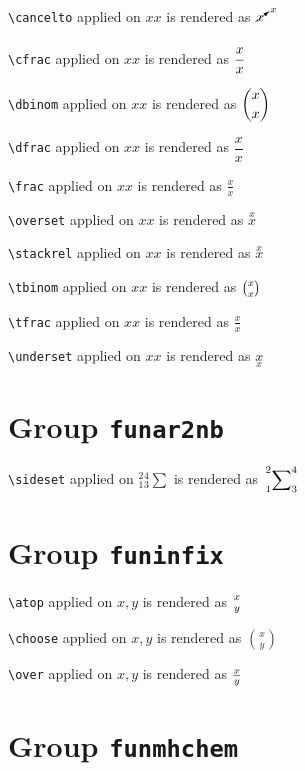 \texttt{\textbackslash cancelto} applied on ${x}{x}$ is rendered as $\cancelto{x}{x}$

\texttt{\textbackslash cfrac} applied on ${x}{x}$ is rendered as $\cfrac{x}{x}$

\texttt{\textbackslash dbinom} applied on ${x}{x}$ is rendered as $\dbinom{x}{x}$

\texttt{\textbackslash dfrac} applied on ${x}{x}$ is rendered as $\dfrac{x}{x}$

\texttt{\textbackslash frac} applied on ${x}{x}$ is rendered as $\frac{x}{x}$





\texttt{\textbackslash overset} applied on ${x}{x}$ is rendered as $\overset{x}{x}$



\texttt{\textbackslash stackrel} applied on ${x}{x}$ is rendered as $\stackrel{x}{x}$

\texttt{\textbackslash tbinom} applied on ${x}{x}$ is rendered as $\tbinom{x}{x}$

\texttt{\textbackslash tfrac} applied on ${x}{x}$ is rendered as $\tfrac{x}{x}$

\texttt{\textbackslash underset} applied on ${x}{x}$ is rendered as $\underset{x}{x}$

\section{ Group \texttt{fun\textunderscore ar2nb}}

\texttt{\textbackslash sideset} applied on ${_1^2}{_3^4}\sum$ is rendered as $\sideset{_1^2}{_3^4}\sum$

\section{ Group \texttt{fun\textunderscore infix}}

\texttt{\textbackslash atop} applied on $ x, y$ is rendered as $x\atop y$

\texttt{\textbackslash choose} applied on $ x, y$ is rendered as $x\choose y$

\texttt{\textbackslash over} applied on $ x, y$ is rendered as $x\over y$

\section{ Group \texttt{fun\textunderscore mhchem}}

